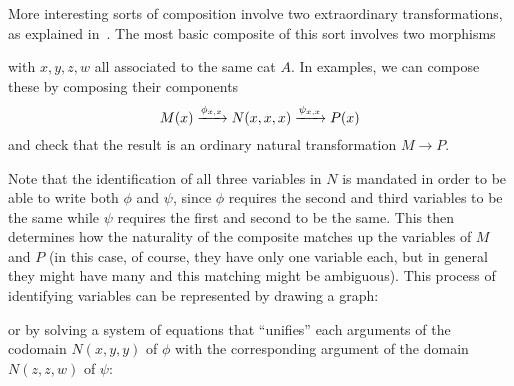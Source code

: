 \documentclass{amsart}
\let\mto\vdash    %
\def\mhom#1#2{\left( #1 \vphantom{\big|}\mto #2 \right)}
\begin{document}
More interesting sorts of composition involve two extraordinary transformations, as explained in~\cite{ek:gen-funct-calc}.
The most basic composite of this sort involves two morphisms
with $x,y,z,w$ all associated to the same cat $A$.
In examples, we can compose these by composing their components
\[ M(x) \xrightarrow{\phi_{x,x}} N(x,x,x) \xrightarrow{\psi_{x,x}} P(x) \]
and check that the result is an ordinary natural transformation $M\to P$.

Note that the identification of all three variables in $N$ is mandated in order to be able to write both $\phi$ and $\psi$, since $\phi$ requires the second and third variables to be the same while $\psi$ requires the first and second to be the same.
This then determines how the naturality of the composite matches up the variables of $M$ and $P$ (in this case, of course, they have only one variable each, but in general they might have many and this matching might be ambiguous).
This process of identifying variables can be represented by drawing a graph:
\begin{center}
\end{center}
or by solving a system of equations that ``unifies'' each arguments of the codomain $N(x,y,y)$ of $\phi$ with the corresponding argument of the domain $N(z,z,w)$ of $\psi$:
\end{document}
